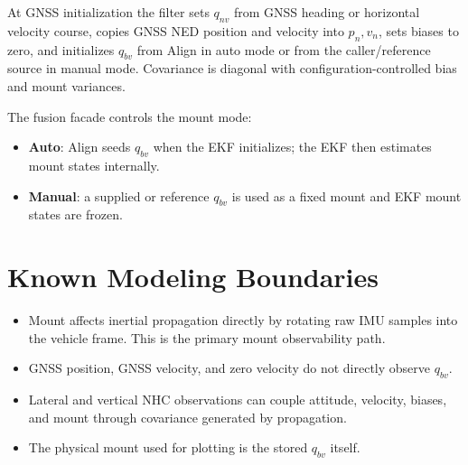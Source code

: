 \documentclass[11pt]{article}
\begin{document}
At GNSS initialization the filter sets \(q_{nv}\) from GNSS heading or horizontal
velocity course, copies GNSS NED position and velocity into \(p_n,v_n\), sets
biases to zero, and initializes \(q_{bv}\) from Align in auto mode or from the
caller/reference source in manual mode. Covariance is diagonal with
configuration-controlled bias and mount variances.

The fusion facade controls the mount mode:
\begin{itemize}[leftmargin=1.5em]
\item \textbf{Auto}: Align seeds \(q_{bv}\) when the EKF initializes; the EKF
then estimates mount states internally.
\item \textbf{Manual}: a supplied or reference \(q_{bv}\) is used as a fixed
mount and EKF mount states are frozen.
\end{itemize}

\section{Known Modeling Boundaries}

\begin{itemize}[leftmargin=1.5em]
\item Mount affects inertial propagation directly by rotating raw IMU samples
into the vehicle frame. This is the primary mount observability path.
\item GNSS position, GNSS velocity, and zero velocity do not directly observe
\(q_{bv}\).
\item Lateral and vertical NHC observations can couple attitude, velocity,
biases, and mount through covariance generated by propagation.
\item The physical mount used for plotting is the stored \(q_{bv}\) itself.
\end{itemize}
\end{document}
